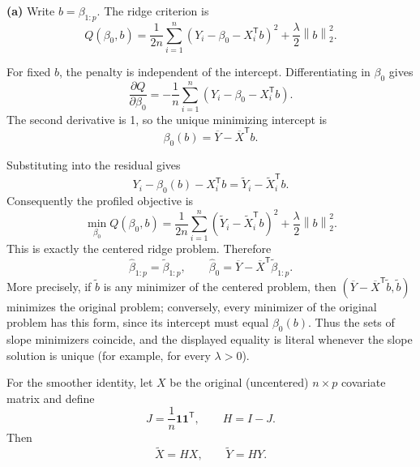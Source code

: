 \documentclass[answers,12pt,addpoints]{exam}
\providecommand{\trans}{^{\mathsf T}}
\providecommand{\normtwo}[1]{\left\lVert #1\right\rVert_2}
\providecommand{\ones}{\mathbf{1}}
\providecommand{\tr}{\operatorname{tr}}
\begin{document}
\begin{questions}

\begin{solution}

\textbf{(a)}
Write $b=\beta_{1:p}$.
The ridge criterion is
\[
Q(\beta_0,b)
=
\frac{1}{2n}
\sum_{i=1}^n
(Y_i-\beta_0-X_i\trans b)^2
+
\frac{\lambda}{2}\normtwo{b}^2.
\]

For fixed $b$, the penalty is independent of the intercept.
Differentiating in $\beta_0$ gives
\[
\frac{\partial Q}{\partial\beta_0}
=
-\frac1n
\sum_{i=1}^n
(Y_i-\beta_0-X_i\trans b).
\]
The second derivative is 1, so the unique minimizing intercept is
\[
\beta_0(b)=\overline Y-\overline X\trans b.
\]

Substituting into the residual gives
\[
Y_i-\beta_0(b)-X_i\trans b
=
\widetilde Y_i-\widetilde X_i\trans b.
\]
Consequently the profiled objective is
\[
\min_{\beta_0}Q(\beta_0,b)
=
\frac{1}{2n}
\sum_{i=1}^n
(\widetilde Y_i-\widetilde X_i\trans b)^2
+
\frac{\lambda}{2}\normtwo{b}^2.
\]
This is exactly the centered ridge problem. Therefore
\[
\boxed{
\widehat\beta_{1:p}=\widetilde\beta_{1:p},
\qquad
\widehat\beta_0
=
\overline Y-\overline X\trans\widetilde\beta_{1:p}.
}
\]
More precisely, if $\widetilde b$ is any minimizer of the centered
problem, then $(\overline Y-\overline X\trans\widetilde b,\widetilde b)$
minimizes the original problem; conversely, every minimizer of the
original problem has this form, since its intercept must equal
$\beta_0(b)$. Thus the sets of slope minimizers coincide, and the
displayed equality is literal whenever the slope solution is unique
(for example, for every $\lambda>0$).

For the smoother identity, let $X$ be the original (uncentered)
$n\times p$ covariate matrix and define
\[
J=\frac1n\ones\ones\trans,
\qquad
H=I-J.
\]
Then
\[
\widetilde X=HX,
\qquad
\widetilde Y=HY.
\]


\end{solution}
\end{questions}
\end{document}
